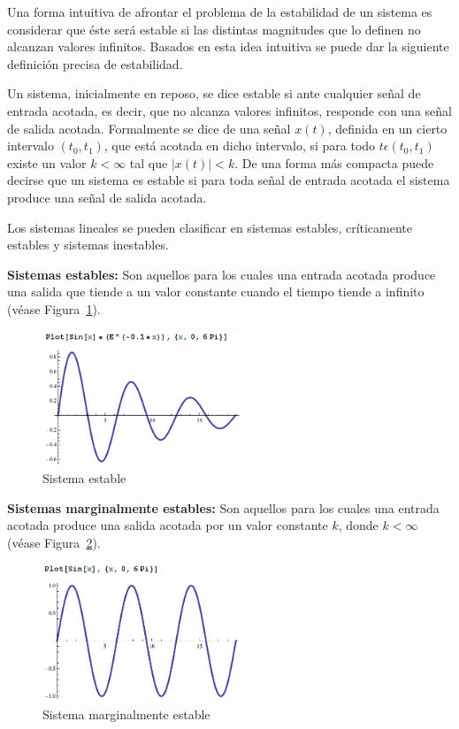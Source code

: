 \documentclass[letterpaper, 11pt, oneside]{article}
\theoremstyle{definition}
\theoremstyle{remark}
\begin{document}
\begin{itemize}
Una forma intuitiva de afrontar el problema de la estabilidad de un sistema es considerar que éste será estable si las distintas magnitudes que lo definen no alcanzan valores infinitos. Basados en esta idea intuitiva se puede dar la siguiente definición precisa de estabilidad.

Un sistema, inicialmente en reposo, se dice estable si ante cualquier señal de entrada acotada, es decir, que no alcanza valores infinitos, responde con una señal de salida acotada. Formalmente se dice de una señal $x(t)$, definida en un cierto intervalo $(t_0 , t_1)$, que está acotada en dicho intervalo, si para todo $t \epsilon (t_0 , t_1)$ existe un valor $k < \infty$ tal que $|x(t)| < k$. De una forma más compacta puede decirse que un sistema es estable si para toda señal de entrada acotada el sistema produce una señal de salida acotada.

Los sistemas lineales se pueden clasificar en sistemas estables, críticamente estables y sistemas inestables.

\textbf{Sistemas estables:} Son aquellos para los cuales una entrada acotada produce una salida que tiende a un valor constante cuando el tiempo tiende a infinito (véase Figura~\ref{sis_estable}).

\begin{figure}[ht]
  \begin{center}
    \includegraphics[width=6cm]{Imagenes/Estable.png}
  \end{center}
    \caption{Sistema estable}
  \label{sis_estable}
\end{figure}

\textbf{Sistemas marginalmente estables:} Son aquellos para los cuales una entrada acotada produce una salida acotada por un valor constante $k$, donde $k < \infty$ (véase Figura~\ref{sis_criestable}).

\begin{figure}[ht]
  \begin{center}
    \includegraphics[width=6cm]{Imagenes/Critica.png}
  \end{center}
    \caption{Sistema marginalmente estable}
  \label{sis_criestable}
\end{figure}


\end{itemize}
\end{document}
